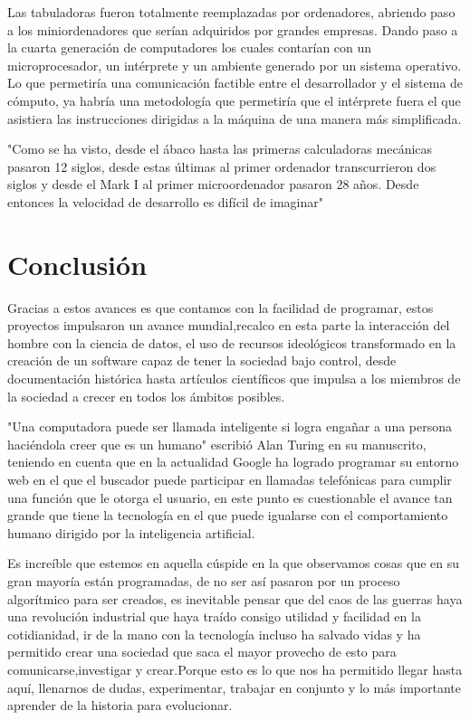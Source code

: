 \documentclass[11pt]{article}
\begin{document}
Las tabuladoras fueron totalmente reemplazadas por ordenadores, abriendo paso a los miniordenadores que serían adquiridos por grandes empresas. Dando paso a la cuarta generación de computadores los cuales contarían con un microprocesador, un intérprete y un ambiente generado por un sistema operativo. Lo que permetiría una comunicación factible entre el desarrollador y el sistema de cómputo, ya habría una metodología que permetiría que el intérprete fuera el que asistiera las instrucciones dirigidas a la máquina de una manera más simplificada.

"Como se ha visto, desde el ábaco hasta las primeras calculadoras mecánicas pasaron 12 siglos, desde estas últimas al primer ordenador transcurrieron dos siglos y desde el Mark I al primer microordenador pasaron 28 años. Desde entonces la velocidad de desarrollo es difícil de imaginar"


\section{Conclusión}
Gracias a estos avances es que contamos con la facilidad de programar, estos proyectos impulsaron un avance mundial,recalco en esta parte la interacción del hombre con la ciencia de datos, el uso de recursos ideológicos transformado en la creación de un software capaz de tener la sociedad bajo control, desde documentación histórica hasta artículos científicos que impulsa a los miembros de la sociedad a crecer en todos los ámbitos posibles.

"Una computadora puede ser llamada inteligente si logra engañar a una persona haciéndola creer que es un humano" escribió Alan Turing en su manuscrito, teniendo en cuenta que en la actualidad Google ha logrado programar su entorno web en el que el buscador puede participar en llamadas telefónicas para cumplir una función que le otorga el usuario, en este punto es cuestionable el avance tan grande que tiene la tecnología en el que puede igualarse con el comportamiento humano dirigido por la inteligencia artificial.

Es increíble que estemos en aquella cúspide en la que observamos cosas que en su gran mayoría están programadas, de no ser así pasaron por un proceso algorítmico para ser creados, es inevitable pensar que del caos de las guerras haya una revolución industrial que haya traído consigo utilidad y facilidad en la cotidianidad, ir de la mano con la tecnología incluso ha salvado vidas y ha permitido crear una sociedad que saca el mayor provecho de esto para comunicarse,investigar y crear.Porque esto es lo que nos ha permitido llegar hasta aquí, llenarnos de dudas, experimentar, trabajar en conjunto y lo más importante aprender de la historia para evolucionar.
\end{document}
